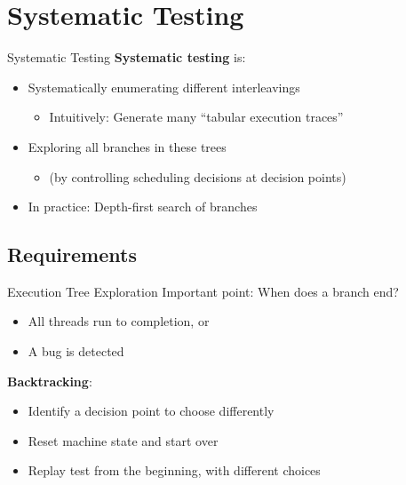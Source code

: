 \documentclass[xcolor=dvipsnames]{beamer}
\begin{document}
\section{Systematic Testing}


\begin{frame}{Systematic Testing}
	\textbf{Systematic testing} is:
	\begin{itemize}
		\item Systematically enumerating different interleavings
		\begin{itemize}
			\item Intuitively: Generate many ``tabular execution traces''
		\end{itemize}
		\item Exploring all branches in these trees
		\begin{itemize}
			\item (by controlling scheduling decisions at decision points)
		\end{itemize}
		\item In practice: Depth-first search of branches
	\end{itemize}
\end{frame}

\subsection{Requirements}


\begin{frame}{Execution Tree Exploration}
	Important point: When does a branch end?
	\begin{itemize}
		\item All threads run to completion, or
		\item A bug is detected %
	\end{itemize}
	{\bf Backtracking}:
	\begin{itemize}
		\item Identify a decision point to choose differently
		\item Reset machine state and start over
		\item Replay test from the beginning, with different choices
	\end{itemize}
\end{frame}
\end{document}
